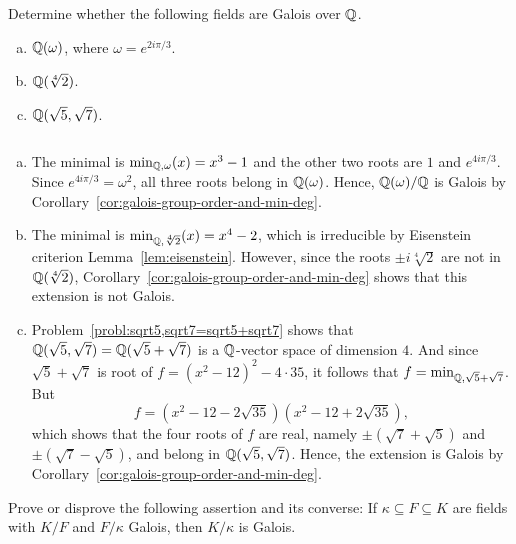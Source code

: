 \begin{probl}
    Determine whether the following fields are Galois over $\mathbb{Q}$.
    \begin{enumerate}[a), font=\upshape]
        \item $\mathbb{Q}(\omega)$, where $\omega = e^{2i\pi/3}$.
        \item $\mathbb{Q}(\sqrt[4]2)$.
        \item $\mathbb{Q}(\sqrt{5}, \sqrt{7})$.
    \end{enumerate}
\end{probl}

\begin{solution}${}$
    \begin{enumerate}[a), font=\upshape]
        \item The minimal is $\min_{\mathbb{Q},\omega}(x)=x^3-1$ and the other two roots are $1$ and $e^{4i\pi/3}$. Since $e^{4i\pi/3}=\omega^2$, all three roots belong in $\mathbb{Q}(\omega)$. Hence, $\mathbb{Q}(\omega)/\mathbb{Q}$ is Galois by Corollary~\ref{cor:galois-group-order-and-min-deg}.

        \item The minimal is $\min_{\mathbb{Q},\sqrt[4]2}(x)=x^4-2$, which is irreducible by Eisenstein criterion Lemma~\ref{lem:eisenstein}. However, since the roots $\pm i\sqrt[4]2$ are not in $\mathbb{Q}(\sqrt[4]2)$, Corollary~\ref{cor:galois-group-order-and-min-deg} shows that this extension is not Galois.

        \item Problem~\ref{probl:sqrt5,sqrt7=sqrt5+sqrt7} shows that $\mathbb{Q}(\sqrt5,\sqrt7)=\mathbb{Q}(\sqrt5+\sqrt7)$ is a $\mathbb{Q}$-vector space of dimension $4$. And since $\sqrt5+\sqrt7$ is root of $f=(x^2-12)^2-4\cdot35$, it follows that $f=\min_{\mathbb{Q},\sqrt5+\sqrt7}$. But
        $$
            f = (x^2-12-2\sqrt{35})(x^2-12+2\sqrt{35}),
        $$
        which shows that the four roots of $f$ are real, namely $\pm(\sqrt7+\sqrt5)$ and $\pm(\sqrt7-\sqrt5)$, and belong in $\mathbb{Q}(\sqrt5,\sqrt7)$. Hence, the extension is Galois by Corollary~\ref{cor:galois-group-order-and-min-deg}.\qedhere
    \end{enumerate}
\end{solution}

\begin{probl}
    Prove or disprove the following assertion and its converse: If\/ $\kappa \subseteq F \subseteq K$ are fields with\/ $K/F$ and\/ $F/\kappa$ Galois, then\/ $K/\kappa$ is Galois.
\end{probl}

